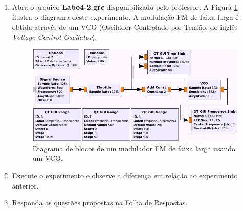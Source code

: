 \documentclass[12pt,addpoints]{exam}
\begin{document}
\begin{enumerate}
    \item Abra o arquivo \textbf{Labo4-2.grc} disponibilizado pelo professor. A Figura \ref{fig:GRC_4-2} ilustra o diagrama deste experimento. A modulação FM de faixa larga é obtida através de um VCO (Oscilador Controlado por Tensão, do inglês {\it Voltage Control Oscilator}).
    \begin{figure}[htb]
        \centering
        \includegraphics[scale=.5]{./Figuras/Labo4-2}
        \caption{Diagrama de blocos de um modulador FM de faixa larga usando um VCO.}
        \label{fig:GRC_4-2}
    \end{figure}
  \item Execute o experimento e observe a diferença em relação ao experimento anterior.
  \item Responda as questões propostas na Folha de Respostas.
\end{enumerate}

%
\end{document}
